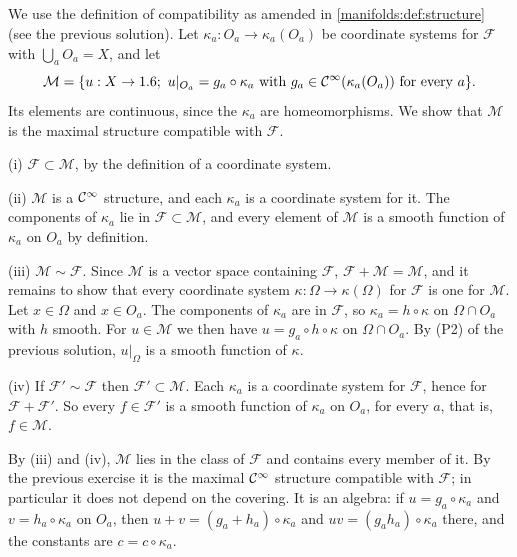 \subsection*{}
We use the definition of compatibility as amended in \cref{manifolds:def:structure}
(see the previous solution). Let $\kappa_a:O_a\to\kappa_a(O_a)$ be coordinate systems for
$\mathcal F$ with $\bigcup_aO_a=X$, and let
\begin{equation*}
\mathcal M=\{u:X\to\R;\ u|_{O_a}=g_a\circ\kappa_a\ \text{with}\ g_a\in\CI(\kappa_a(O_a))\ \text{for every }a\}.
\end{equation*}
Its elements are continuous, since the $\kappa_a$ are homeomorphisms. We show that
$\mathcal M$ is the maximal structure compatible with $\mathcal F$.

(i) $\mathcal F\subset\mathcal M$, by the definition of a coordinate system.

(ii) $\mathcal M$ is a $\mathcal{C}^\infty$ structure, and each $\kappa_a$ is a coordinate system for it. The
components of $\kappa_a$ lie in $\mathcal F\subset\mathcal M$, and every element of $\mathcal M$
is a smooth function of $\kappa_a$ on $O_a$ by definition.

(iii) $\mathcal M\sim\mathcal F$. Since $\mathcal M$ is a vector space containing $\mathcal F$,
$\mathcal F+\mathcal M=\mathcal M$, and it remains to show
that every coordinate system $\kappa:\Omega\to\kappa(\Omega)$ for $\mathcal F$ is one for
$\mathcal M$. Let $x\in\Omega$ and $x\in O_a$. The components of $\kappa_a$ are in $\mathcal F$, so
$\kappa_a=h\circ\kappa$ on $\Omega\cap O_a$ with $h$ smooth. For $u\in\mathcal M$ we then have
$u=g_a\circ h\circ\kappa$ on $\Omega\cap O_a$. By (P2) of the previous solution, $u|_\Omega$
is a smooth function of $\kappa$.

(iv) If $\mathcal F'\sim\mathcal F$ then $\mathcal F'\subset\mathcal M$. Each $\kappa_a$ is a
coordinate system for $\mathcal F$, hence for $\mathcal F+\mathcal F'$. So every $f\in\mathcal F'$
is a smooth function of $\kappa_a$ on $O_a$, for every $a$, that is, $f\in\mathcal M$.

By (iii) and (iv), $\mathcal M$ lies in the class of $\mathcal F$ and contains every member of it. By the
previous exercise it is the maximal $\mathcal{C}^\infty$ structure compatible with $\mathcal F$; in
particular it does not depend on the covering. It is an algebra: if
$u=g_a\circ\kappa_a$ and $v=h_a\circ\kappa_a$ on $O_a$, then $u+v=(g_a+h_a)\circ\kappa_a$ and
$uv=(g_ah_a)\circ\kappa_a$ there, and the constants are $c=c\circ\kappa_a$.

